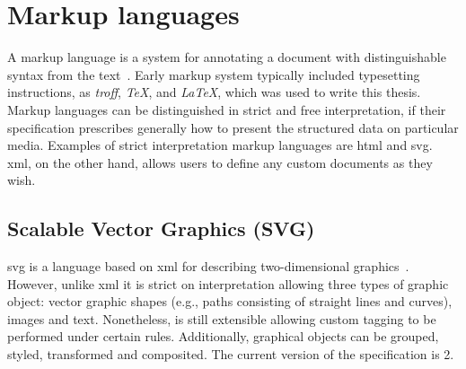 %

\section{Markup languages}
A markup language is a system for annotating a document with distinguishable
syntax from the text~\cite{markup2019webster}. Early markup system typically included typesetting
instructions, as \emph{troff}, \emph{TeX}, and \emph{LaTeX}, which was used to
write this thesis.
Markup languages can be distinguished in strict and free interpretation, if
their specification prescribes generally how to present the structured data on
particular media.
Examples of strict interpretation markup languages are \gls{html} and
\gls{svg}. \gls{xml}, on the other hand, allows users to define any custom
documents as they wish.

\subsection{Scalable Vector Graphics (SVG)}
\gls{svg} is a language based on \gls{xml} for describing two-dimensional
graphics~\cite{svg2Specs}. However, unlike \gls{xml} it is strict on
interpretation allowing three types of graphic object: vector graphic shapes
(e.g., paths consisting of straight lines and curves), images and
text. Nonetheless, is still extensible allowing custom tagging to be performed
under certain rules. Additionally, graphical objects can be grouped, styled, transformed and
composited. The current version of the specification is 2.

